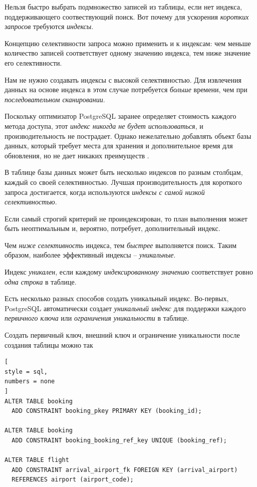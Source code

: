 \documentclass[%
	11pt,
	a4paper,
	utf8,
		]{article}
\begin{document}
Нельзя быстро выбрать подмножество записей из таблицы, если нет индекса, поддерживающего соотвествующий поиск. Вот почему для ускорения \emph{коротких запросов} требуются \emph{индексы}.

Концепцию селективности запроса можно применить и к индексам: чем меньше количество записей соответствует одному значению индекса, тем ниже значение его селективности. 

Нам не нужно создавать индексы с высокой селективностью. Для извлечения данных на основе индекса в этом случае потребуется \emph{больше} времени, чем при \emph{последовательном сканировании}. 

Поскольку оптимизатор PostgreSQL заранее определяет стоимость каждого метода доступа, этот \emph{индекс никогда не будет использоваться}, и производительность не пострадает. Однако нежелательно добавлять объект базы данных, который требует места для хранения и дополнительное время для обновления, но не дает никаких преимуществ \cite[]{dombrovskaya:postgresql-2022}.

В таблице базы данных может быть несколько индексов по разным столбцам, каждый со своей селективностью. Лучшая производительность для короткого запроса достигается, когда используются \emph{индексы с самой низкой селективностью}.

Если самый строгий критерий не проиндексирован, то план выполнения может быть неоптимальным и, вероятно, потребует, дополнительный индекс.

Чем \emph{ниже селективность} индекса, тем \emph{быстрее} выполняется поиск. Таким образом, наиболее эффективный индексы -- \emph{уникальные}.

Индекс \emph{уникален}, если каждому \emph{индексированному значению} соответствует ровно \emph{одна строка} в таблице.

Есть несколько разных способов создать уникальный индекс. Во-первых, PostgreSQL автоматически создает \emph{уникальный индекс} для поддержки каждого \emph{первичного ключа} или \emph{ограничения уникальности} в таблице.

Создать первичный ключ, внешний ключ и ограничение уникальности после создания таблицы можно так
\begin{lstlisting}[
style = sql,
numbers = none	
]
ALTER TABLE booking
  ADD CONSTRAINT booking_pkey PRIMARY KEY (booking_id);
  
ALTER TABLE booking
  ADD CONSTRAINT booking_booking_ref_key UNIQUE (booking_ref);
  
ALTER TABLE flight
  ADD CONSTRAINT arrival_airport_fk FOREIGN KEY (arrival_airport)
  REFERENCES airport (airport_code);
\end{lstlisting}
\end{document}
